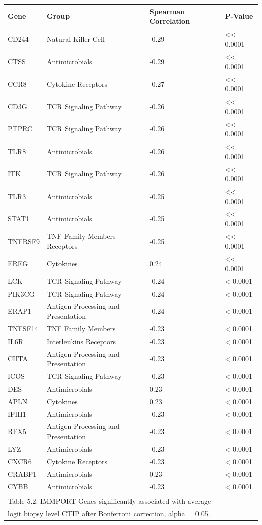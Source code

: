 \documentclass[
]{book}
\begin{document}
\begin{tabular}{l|l|l|l}
\hline
Gene & Group & Spearman Correlation & P-Value\\
\hline
CD244 & Natural Killer Cell & -0.29 & << 0.0001\\
\hline
CTSS & Antimicrobials & -0.29 & << 0.0001\\
\hline
CCR8 & Cytokine Receptors & -0.27 & << 0.0001\\
\hline
CD3G & TCR Signaling Pathway & -0.26 & << 0.0001\\
\hline
PTPRC & TCR Signaling Pathway & -0.26 & << 0.0001\\
\hline
TLR8 & Antimicrobials & -0.26 & << 0.0001\\
\hline
ITK & TCR Signaling Pathway & -0.26 & << 0.0001\\
\hline
TLR3 & Antimicrobials & -0.25 & << 0.0001\\
\hline
STAT1 & Antimicrobials & -0.25 & << 0.0001\\
\hline
TNFRSF9 & TNF Family Members Receptors & -0.25 & << 0.0001\\
\hline
EREG & Cytokines & 0.24 & << 0.0001\\
\hline
LCK & TCR Signaling Pathway & -0.24 & < 0.0001\\
\hline
PIK3CG & TCR Signaling Pathway & -0.24 & < 0.0001\\
\hline
ERAP1 & Antigen Processing and Presentation & -0.24 & < 0.0001\\
\hline
TNFSF14 & TNF Family Members & -0.23 & < 0.0001\\
\hline
IL6R & Interleukins Receptors & -0.23 & < 0.0001\\
\hline
CIITA & Antigen Processing and Presentation & -0.23 & < 0.0001\\
\hline
ICOS & TCR Signaling Pathway & -0.23 & < 0.0001\\
\hline
DES & Antimicrobials & 0.23 & < 0.0001\\
\hline
APLN & Cytokines & 0.23 & < 0.0001\\
\hline
IFIH1 & Antimicrobials & -0.23 & < 0.0001\\
\hline
RFX5 & Antigen Processing and Presentation & -0.23 & < 0.0001\\
\hline
LYZ & Antimicrobials & -0.23 & < 0.0001\\
\hline
CXCR6 & Cytokine Receptors & -0.23 & < 0.0001\\
\hline
CRABP1 & Antimicrobials & 0.23 & < 0.0001\\
\hline
CYBB & Antimicrobials & -0.23 & < 0.0001\\
\hline
\multicolumn{4}{l}{\textsuperscript{} Table 5.2: IMMPORT Genes significantly associated with average}\\
\multicolumn{4}{l}{logit biopsy level CTIP after Bonferroni correction, alpha = 0.05.}\\
\end{tabular}
\end{document}
